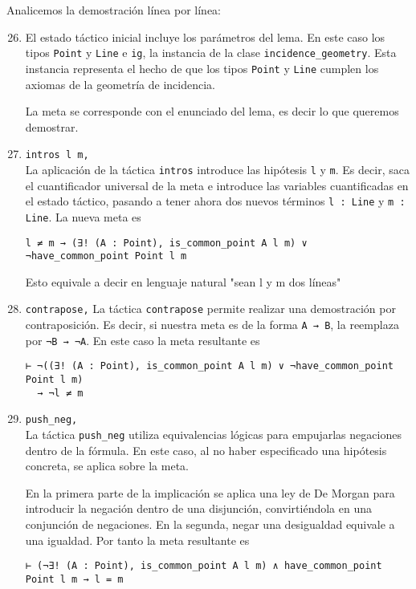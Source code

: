 Analicemos la demostración línea por línea:
\begin{enumerate}[label=L.\arabic*, topsep=0mm]
	\setcounter{enumi}{25}

	\item El estado táctico inicial incluye los parámetros del lema. En este caso
	      los tipos \lstinline{Point} y \lstinline{Line} e \lstinline{ig}, la
	      instancia de la clase \lstinline{incidence_geometry}. Esta instancia
	      representa el hecho de que los tipos \lstinline{Point} y \lstinline{Line}
	      cumplen los axiomas de la geometría de incidencia.

	      La meta se corresponde con el enunciado del lema, es decir lo que queremos
	      demostrar.


	\item \lstinline{intros l m,}\\[.5em]
	      La aplicación de la táctica \lstinline{intros}
	      introduce las hipótesis \lstinline{l} y \lstinline{m}. Es decir, saca el
	      cuantificador universal de la meta e introduce las variables cuantificadas
	      en el estado táctico, pasando a tener ahora dos nuevos términos
	      \lstinline{l : Line} y \lstinline{m : Line}. La nueva meta es
	      \begin{lstlisting}
l ≠ m → (∃! (A : Point), is_common_point A l m) ∨ ¬have_common_point Point l m
\end{lstlisting}
	      Esto equivale a decir en lenguaje natural "sean l y m dos líneas"

	\item \lstinline{contrapose,} La táctica \lstinline{contrapose} permite
	      realizar una demostración por contraposición. Es decir, si nuestra meta es
	      de la forma \lstinline{A → B}, la reemplaza por \lstinline{¬B → ¬A}. En
	      este caso la meta resultante es
	      \begin{lstlisting}
⊢ ¬((∃! (A : Point), is_common_point A l m) ∨ ¬have_common_point Point l m) 
  → ¬l ≠ m
\end{lstlisting}

	\item \lstinline{push_neg, }\\[.5em] La táctica \lstinline{push_neg} utiliza
	      equivalencias lógicas para \guillemotleft empujar\guillemotright las negaciones dentro de la fórmula.
	      En este caso, al no haber especificado una hipótesis concreta, se aplica
	      sobre la meta.

	      En la primera parte de la implicación se aplica una ley de De Morgan para
	      introducir la negación dentro de una disjunción, convirtiéndola en una
	      conjunción de negaciones. En la segunda, negar una desigualdad equivale a
	      una igualdad. Por tanto la meta resultante es
	      \begin{lstlisting}
⊢ (¬∃! (A : Point), is_common_point A l m) ∧ have_common_point Point l m → l = m
\end{lstlisting}


\end{enumerate}
